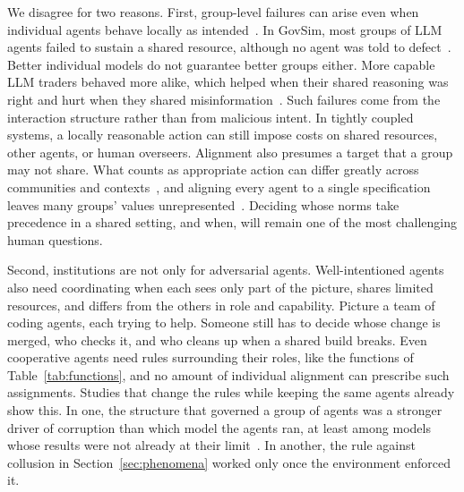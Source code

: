 \documentclass[runningheads]{llncs}
\begin{document}
We disagree for two reasons. First, group-level failures can arise even when individual agents behave locally as intended~\citep{hammond2025multiagentrisksadvancedai}. In GovSim, most groups of LLM agents failed to sustain a shared resource, although no agent was told to defect~\mbox{\citep{piatti2024govsim}}. Better individual models do not guarantee better groups either. More capable LLM traders behaved more alike, which helped when their shared reasoning was right and hurt when they shared misinformation~\mbox{\citep{ross2026riskier}}. Such failures come from the interaction structure rather than from malicious intent. In tightly coupled systems, a locally reasonable action can still impose costs on shared resources, other agents, or human overseers. Alignment also presumes a target that a group may not share. What counts as appropriate action can differ greatly across communities and contexts~\mbox{\citep{leibo2024appropriateness}}, and aligning every agent to a single specification leaves many groups' values unrepresented~\mbox{\citep{sorensen2024roadmap}}. Deciding whose norms take precedence in a shared setting, and when, will remain one of the most challenging human questions.

Second, institutions are not only for adversarial agents. Well-intentioned agents also need coordinating when each sees only part of the picture, shares limited resources, and differs from the others in role and capability. Picture a team of coding agents, each trying to help. Someone still has to decide whose change is merged, who checks it, and who cleans up when a shared build breaks. Even cooperative agents need rules surrounding their roles, like the functions of Table~\mbox{\ref{tab:functions}}, and no amount of individual alignment can prescribe such assignments. Studies that change the rules while keeping the same agents already show this. In one, the structure that governed a group of agents was a stronger driver of corruption than which model the agents ran, at least among models whose results were not already at their limit~\mbox{\citep{vedanta2026corrupt}}. In another, the rule against collusion in Section~\mbox{\ref{sec:phenomena}} worked only once the environment enforced it.
\end{document}

